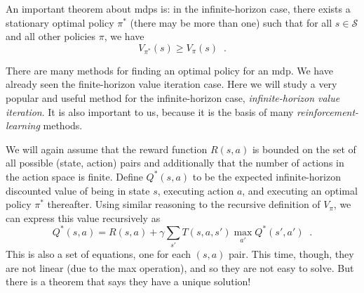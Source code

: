 An important theorem about {\sc mdp}s is: in the infinite-horizon
case, there exists a stationary
 optimal policy $\pi^*$ (there may be more than
one) such that for all $s \in \mathcal S$ and all other policies
$\pi$, we have
\begin{equation}
  V_{\pi^*}(s) \ge V_{\pi}(s) \;\;.
\end{equation}


There are many methods for finding an optimal policy for an {\sc mdp}.
We have already seen the finite-horizon value iteration case.  Here we
will study a very popular and useful method for the infinite-horizon
case, {\em infinite-horizon value iteration}.  It is also important to
us, because it is the basis of many {\em reinforcement-learning}
methods.

We will again assume that the reward function $R(s,a)$ is bounded on the
set of all possible (state, action) pairs and additionally that the number
of actions in the action space is finite.
Define $Q^*(s, a)$ to be the expected infinite-horizon discounted
value of being in state $s$, executing action $a$, and executing
an optimal  policy $\pi^*$ thereafter.  Using similar reasoning to the
recursive definition  of  $V_\pi$,  we can express this value
recursively as
\begin{equation}
  Q^*(s, a) = R(s, a) + \gamma\sum_{s'}T(s, a, s')\max_{a'}Q^*(s',
  a') \;\;.
\end{equation}
This is also a set of equations, one for each $(s, a)$ pair.  This
time, though, they are not linear (due to the max operation), and so
they are not easy to solve.  But there is a theorem that says they
have a unique solution!

